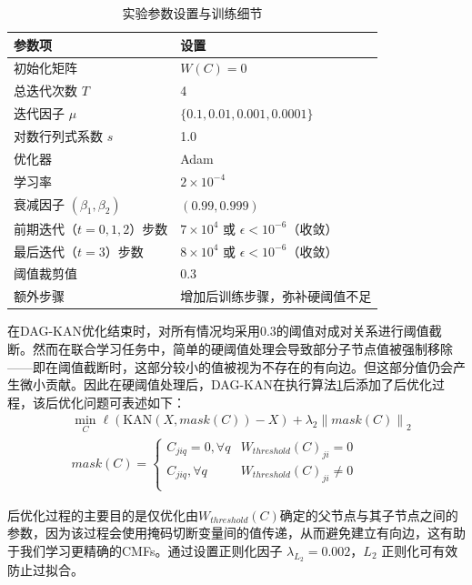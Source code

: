 \begin{table}[htbp]
	\centering
	\caption{实验参数设置与训练细节}
	\label{tab:params}
	\begin{tabular}{ll}
		\toprule
		\textbf{参数项} & \textbf{设置} \\
		\midrule
		初始化矩阵 & \(W(C) = 0\) \\
		总迭代次数 \(T\) & 4 \\
		迭代因子 \(\mu\) & \(\{0.1, 0.01, 0.001, 0.0001\}\) \\
		对数行列式系数 \(s\) & 1.0 \\
		优化器 & Adam \\
		学习率 & \(2\times 10^{-4}\) \\
		衰减因子 \((\beta_1, \beta_2)\) & \((0.99, 0.999)\) \\
		前期迭代（\(t=0,1,2\)）步数 & \(7\times 10^4\) 或 \(\epsilon<10^{-6}\)（收敛） \\
		最后迭代（\(t=3\)）步数 & \(8\times 10^4\) 或 \(\epsilon<10^{-6}\)（收敛） \\
		阈值裁剪值 & 0.3 \\
		额外步骤 & 增加后训练步骤，弥补硬阈值不足 \\
		\bottomrule
	\end{tabular}
\end{table}

在DAG-KAN优化结束时，对所有情况均采用0.3的阈值对成对关系进行阈值截断。然而在联合学习任务中，简单的硬阈值处理会导致部分子节点值被强制移除——即在阈值截断时，这部分较小的值被视为不存在的有向边。但这部分值仍会产生微小贡献。因此在硬阈值处理后，DAG-KAN在执行算法\ref{tab:params}后添加了后优化过程，该后优化问题可表述如下：
\begin{equation}
	\begin{aligned}
		&\underset{C}{\min}\ell \left( \mathrm{KAN}\left( X,mask\left( C \right) \right) -X \right) +\lambda _2\left\| mask\left( C \right) \right\| _2
		\\
		&mask\left( C \right) =\begin{cases}
			C_{jiq}=0,\forall q&		W_{threshold}\left( C \right) _{ji}=0\\
			C_{jiq},\forall q&		W_{threshold}\left( C \right) _{ji}\ne 0\\
		\end{cases}
	\end{aligned}
\end{equation}

后优化过程的主要目的是仅优化由$W_{threshold}\left( C \right)$确定的父节点与其子节点之间的参数，因为该过程会使用掩码切断变量间的值传递，从而避免建立有向边，这有助于我们学习更精确的CMFs。通过设置正则化因子 $\lambda_{L_2} =0.002$，$L_2$ 正则化可有效防止过拟合。

